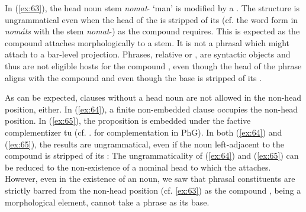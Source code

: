 \documentclass[output=paper]{LSP/langsci}
\begin{document}
\z
In (\ref{ex:63}), the head noun stem \textit{nomat}- `man' is modified by a . The structure is ungrammatical even when the head of the  is stripped of its  (cf. the word form in  \textit{nomáts} with the stem \textit{nomat}-) as the compound  requires. This is expected as the compound  attaches morphologically to a stem. It is not a phrasal  which might attach to a bar-level projection. Phrases, relative or , are syntactic objects and thus are not eligible hosts for the compound , even though the head of the phrase aligns with the compound  and even though the base is stripped of its . 

As can be expected, clauses without a head noun are not allowed in the non-head position, either. In (\ref{ex:64}), a finite non-embedded clause occupies the non-head position. In (\ref{ex:65}), the proposition is embedded under the factive complementizer tu (cf. \citealt{Bagriacik}. for complementation in PhG). In both (\ref{ex:64}) and (\ref{ex:65}), the results are ungrammatical, even if the noun left-adjacent to the compound  is stripped of its :\largerpage
{}
\z
{}
\z
The ungrammaticality of (\ref{ex:64}) and (\ref{ex:65}) can be reduced to the non-existence of a nominal head to which the  attaches. However, even in the existence of an noun, we saw that phrasal constituents are strictly barred from the non-head position (cf. \ref{ex:63}) as the compound , being a morphological element, cannot take a phrase as its base. 
\end{document}

